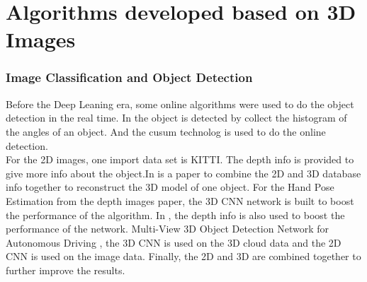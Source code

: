 \documentclass[a4paper,12pt]{article}
\begin{document}
\part{Algorithms developed based on 3D Images}
\section{Image Classification and Object Detection}
Before the Deep Leaning era, some online algorithms were used to do the object detection in the real time. In\cite{stamoscnn} the object is detected by collect the histogram of the angles of an object. And the cusum technolog is used to do the online detection.\\



	



For the 2D images, one import data set is KITTI\cite{Geiger2013IJRR}. The depth info is provided to give more info about the object.In \cite{DBLP:journals/corr/ChenMWLX16} is a paper to combine the 2D and 3D database info together to reconstruct the 3D model of one object. For the Hand Pose Estimation from the depth images paper\cite{Ge_2017_CVPR}, the 3D CNN network is built to boost the performance of the algorithm. In \cite{DBLP:journals/corr/abs-1301-3572}, the depth info is also used to boost the performance of the network.  Multi-View 3D Object Detection Network for Autonomous Driving \cite{Chabot_2017_CVPR}, the 3D CNN is used on the 3D cloud data and the 2D CNN is used on the image data. Finally, the 2D and 3D are combined together to further improve the results.




 








\end{document}
